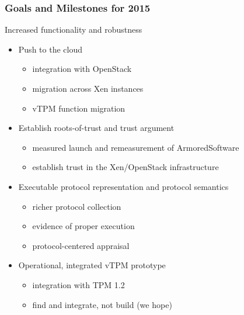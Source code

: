 \documentclass{beamer}
\begin{document}
\begin{frame}
  \frametitle{Goals and Milestones for 2015}

  \begin{center}
    {\color{kublue}Increased functionality and robustness}
  \end{center}

  \begin{itemize}
  \item Push to the cloud
    \begin{itemize}
    \item integration with OpenStack
    \item migration across Xen instances
    \item vTPM function migration
    \end{itemize}
  \item Establish roots-of-trust and trust argument
    \begin{itemize}
    \item measured launch and remeasurement of ArmoredSoftware
    \item establish trust in the Xen/OpenStack infrastructure
    \end{itemize}
  \item Executable protocol representation and protocol semantics
    \begin{itemize}
    \item richer protocol collection
    \item evidence of proper execution
    \item protocol-centered appraisal
    \end{itemize}
  \item Operational, integrated vTPM prototype
    \begin{itemize}
    \item integration with TPM 1.2
    \item find and integrate, not build (we hope)
    \end{itemize}
  \end{itemize}
\end{frame}
\end{document}
